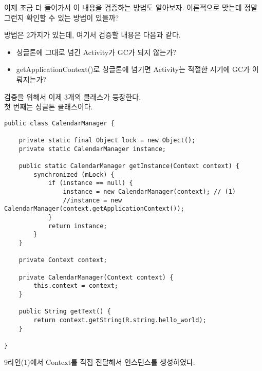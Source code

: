 
이제 조금 더 들어가서 이 내용을 검증하는 방법도 알아보자.
이론적으로 맞는데 정말 그런지 확인할 수 있는 방법이 있을까? 

방법은 2가지가 있는데, 여기서 검증할 내용은 다음과 같다. 
\begin{itemize}
\item 싱글톤에 그대로 넘긴 Activity가 GC가 되지 않는가?
\item getApplicationContext()로 싱글톤에 넘기면 Activity는 적절한 시기에 GC가 이뤄지는가?
\end{itemize}

검증을 위해서 이제 3개의 클래스가 등장한다.\\ 

첫 번째는 싱글톤 클래스이다.
\begin{lstlisting}[frame=single]
public class CalendarManager {

	private static final Object lock = new Object();
	private static CalendarManager instance;
	
	public static CalendarManager getInstance(Context context) {
		synchronized (mLock) {
			if (instance == null) {
				instance = new CalendarManager(context); // (1)
				//instance = new CalendarManager(context.getApplicationContext());
			}
			return instance;
		}
	}
	
	private Context context;
	
	private CalendarManager(Context context) {
		this.context = context;
	}
	
	public String getText() {
		return context.getString(R.string.hello_world);
	}

}
\end{lstlisting}
9라인(1)에서 Context를 직접 전달해서 인스턴스를 생성하였다.\\

